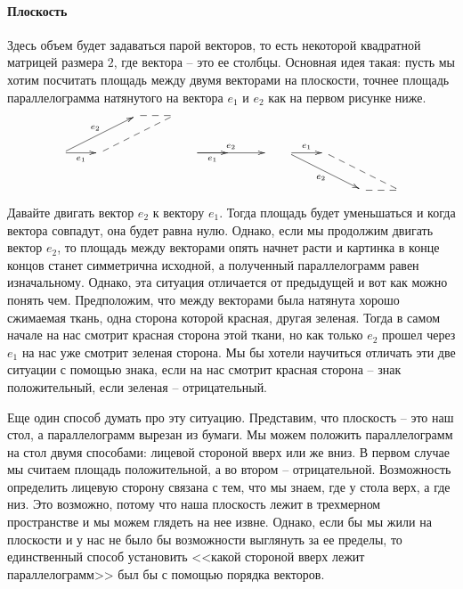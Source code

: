 \paragraph{Плоскость}

Здесь объем будет задаваться парой векторов, то есть некоторой квадратной матрицей размера $2$, где вектора -- это ее столбцы.
Основная идея такая: пусть мы хотим посчитать площадь между двумя векторами на плоскости, точнее площадь параллелограмма натянутого на вектора $e_1$ и $e_2$ как на первом рисунке ниже.
\[
\xymatrix{
	{}&{}&{}\ar@{--}[r]&{}\\
	{}\ar[urr]^{e_2}\ar[r]_{e_1}&{}\ar@{--}[urr]&{}&{}\\
	{}&{}&{}&{}\\
}\quad
\xymatrix{
	{}&{}&{}\\
	{}\ar[rr]^{e_2}\ar[r]_{e_1}&{}&{}\\
	{}&{}&{}\\
}\quad
\xymatrix{
	{}&{}&{}&{}\\
	{}\ar[drr]_{e_2}\ar[r]^{e_1}&{}\ar@{--}[drr]&{}&{}\\
	{}&{}&{}\ar@{--}[r]&{}\\
}
\]
Давайте двигать вектор $e_2$ к вектору $e_1$.
Тогда площадь будет уменьшаться и когда вектора совпадут, она будет равна нулю.
Однако, если мы продолжим двигать вектор $e_2$, то площадь между векторами опять начнет расти и картинка в конце концов станет симметрична исходной, а полученный параллелограмм равен изначальному.
Однако, эта ситуация отличается от предыдущей и вот как можно понять чем.
Предположим, что между векторами была натянута хорошо сжимаемая ткань, одна сторона которой красная, другая зеленая.
Тогда в самом начале на нас смотрит красная сторона этой ткани, но как только $e_2$ прошел через $e_1$ на нас уже смотрит зеленая сторона.
Мы бы хотели научиться отличать эти две ситуации с помощью знака, если на  нас смотрит красная сторона -- знак положительный, если зеленая -- отрицательный.

Еще один способ думать про эту ситуацию.
Представим, что плоскость -- это наш стол, а параллелограмм вырезан из бумаги.
Мы можем положить параллелограмм на стол двумя способами: лицевой стороной вверх или же вниз.
В первом случае мы считаем площадь положительной, а во втором -- отрицательной.
Возможность определить лицевую сторону связана с тем, что мы знаем, где у стола верх, а где низ.
Это возможно, потому что наша плоскость лежит в трехмерном пространстве и мы можем глядеть на нее извне.
Однако, если бы мы жили на плоскости и у нас не было бы возможности выглянуть за ее пределы, то единственный способ установить <<какой стороной вверх лежит параллелограмм>> был бы с помощью порядка векторов.

